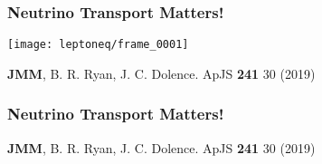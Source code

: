 \documentclass[]{beamer}
\begin{document}
\begin{frame}
\begin{columns}
\begin{column}{6cm}
{
      }
    \end{column}
    \end{columns}
\end{frame}

\begin{frame}
  \frametitle{Neutrino Transport Matters!}
  \begin{center}
    \texttt{[image: leptoneq/frame\_0001]}
  \end{center}
  \begin{tiny}
    \textbf{JMM}, B. R. Ryan, J. C. Dolence. ApJS \textbf{241} 30 (2019) 
  \end{tiny}
\end{frame}

\begin{frame}
  \frametitle{Neutrino Transport Matters!}
  \begin{center}
  \end{center}
  \begin{tiny}
    \textbf{JMM}, B. R. Ryan, J. C. Dolence. ApJS \textbf{241} 30 (2019) 
  \end{tiny}
\end{frame}
\end{document}
